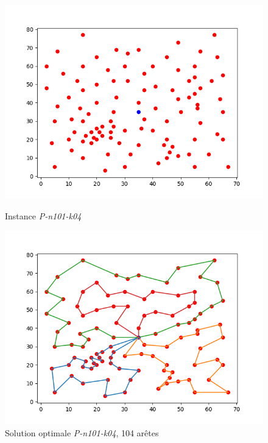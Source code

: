 \documentclass[a4paper,11pt]{article}%
\begin{document}
\begin{figure}[h!]
        \begin{minipage}[c]{.46\linewidth}
        \centering
        \includegraphics[scale=0.4]{Instance10104}
        
        \caption{Instance \emph{P-n101-k04}}
        \label{P10104}
    \end{minipage}
    \hfill%
    \begin{minipage}[c]{.46\linewidth}
        \centering
        \includegraphics[scale=0.4]{Solution10104}
        
        \caption{Solution optimale \emph{P-n101-k04}, 104 arêtes}
        \label{solP10104}
    \end{minipage}
\end{figure}
\end{document}
